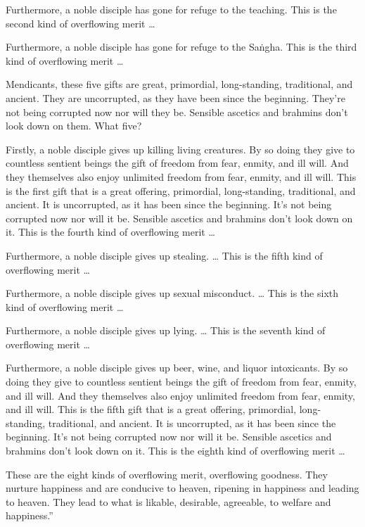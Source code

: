 \documentclass[12pt,openany]{book}%
\begin{document}
Furthermore, a noble disciple has gone for refuge to the teaching. This is the second kind of overflowing merit … 

Furthermore, a noble disciple has gone for refuge to the \textsanskrit{Saṅgha}. This is the third kind of overflowing merit … 

Mendicants, these five gifts are great, primordial, long-standing, traditional, and ancient. They are uncorrupted, as they have been since the beginning. They’re not being corrupted now nor will they be. Sensible ascetics and brahmins don’t look down on them. What five? 

Firstly, a noble disciple gives up killing living creatures. By so doing they give to countless sentient beings the gift of freedom from fear, enmity, and ill will. And they themselves also enjoy unlimited freedom from fear, enmity, and ill will. This is the first gift that is a great offering, primordial, long-standing, traditional, and ancient. It is uncorrupted, as it has been since the beginning. It’s not being corrupted now nor will it be. Sensible ascetics and brahmins don’t look down on it. This is the fourth kind of overflowing merit … 

Furthermore, a noble disciple gives up stealing. … This is the fifth kind of overflowing merit … 

Furthermore, a noble disciple gives up sexual misconduct. … This is the sixth kind of overflowing merit … 

Furthermore, a noble disciple gives up lying. … This is the seventh kind of overflowing merit … 

Furthermore, a noble disciple gives up beer, wine, and liquor intoxicants. By so doing they give to countless sentient beings the gift of freedom from fear, enmity, and ill will. And they themselves also enjoy unlimited freedom from fear, enmity, and ill will. This is the fifth gift that is a great offering, primordial, long-standing, traditional, and ancient. It is uncorrupted, as it has been since the beginning. It’s not being corrupted now nor will it be. Sensible ascetics and brahmins don’t look down on it. This is the eighth kind of overflowing merit … 

These are the eight kinds of overflowing merit, overflowing goodness. They nurture happiness and are conducive to heaven, ripening in happiness and leading to heaven. They lead to what is likable, desirable, agreeable, to welfare and happiness.” 
\end{document}
